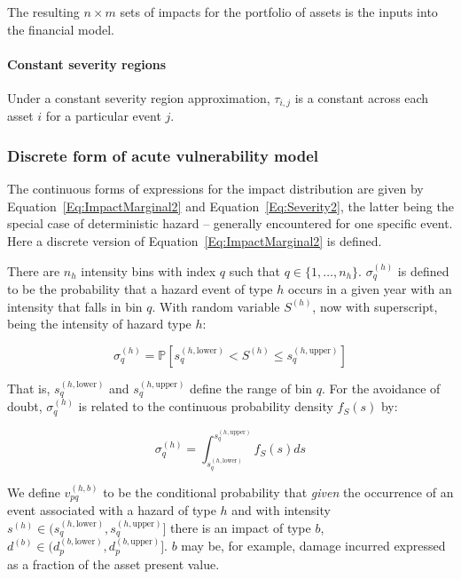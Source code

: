 \documentclass[a4paper,11pt]{extarticle} %
\begin{document}
The resulting $n \times m$ sets of impacts for the portfolio of assets is the inputs into the financial model.

\paragraph{Constant severity regions}
Under a constant severity region approximation, $\tau_{i, j}$ is a constant across each asset $i$ for a particular event $j$.


\subsubsection{Discrete form of acute vulnerability model}
\label{Sec:MathematicalDescriptionOfAssetImpactModel}

The continuous forms of expressions for the impact distribution are given by Equation~\ref{Eq:ImpactMarginal2} and Equation~\ref{Eq:Severity2}, the latter being the special case of deterministic hazard -- generally encountered for one specific event. Here a discrete version of Equation~\ref{Eq:ImpactMarginal2} is defined.

There are $n_h$ intensity bins with index $q$ such that $q \in \{1, \dots, n_h \}$.  $\sigma^{(h)}_q$ is defined to be the probability that a hazard event of type $h$ occurs in a given year with an intensity that falls in bin $q$. With random variable $S^{(h)}$, now with superscript, being the intensity of hazard type $h$:

\begin{equation}
    \label{Eq:Discrete1}
    \sigma^{(h)}_q = \mathbb{P} \left[ s^{(h, \text{lower})}_q < S^{(h)} \le s^{(h, \text{upper})}_q \right]
\end{equation}

That is, $s^{(h, \text{lower})}_q$ and $s^{(h, \text{upper})}_q$ define the range of bin $q$. For the avoidance of doubt, $\sigma^{(h)}_q$ is related to the continuous probability density $f_S(s)$ by:

\begin{equation}
    \label{Eq:Discrete2}
    \sigma^{(h)}_q = \int_ {s^{(h, \text{lower})}_q}^{s^{(h, \text{upper})}_q} f_S(s) ds
\end{equation}

We define $v^{(h, b)}_{pq}$ to be the conditional probability that \emph{given} the occurrence of an event associated with a hazard of type $h$ and with intensity $s^{(h)} \in (s^{(h, \text{lower})}_q, s^{(h, \text{upper})}_q]$ there is an impact of type $b$, $d^{(b)} \in (d^{(b,\text{lower})}_p, d^{(b,\text{upper})}_p]$. $b$ may be, for example, damage incurred expressed as a fraction of the asset present value.
\end{document}
